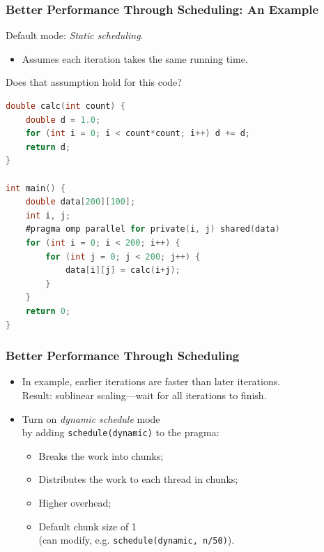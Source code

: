 \begin{frame}[fragile]
  \frametitle{Better Performance Through Scheduling: An Example}

  

  Default mode: \emph{Static scheduling}.
  \begin{itemize}
    \item Assumes each iteration takes the same running time.
  \end{itemize}

  Does that assumption hold for this code?

  \begin{lstlisting}[language=C,morekeywords={foreach,pragma,omp,parallel,single,nowait,task,untied,barrier,taskyield}]
double calc(int count) {
    double d = 1.0;
    for (int i = 0; i < count*count; i++) d += d;
    return d;
}

int main() {
    double data[200][100];
    int i, j;
    #pragma omp parallel for private(i, j) shared(data)
    for (int i = 0; i < 200; i++) {
        for (int j = 0; j < 200; j++) {
            data[i][j] = calc(i+j);
        }
    }
    return 0;
}
  \end{lstlisting}
  

\end{frame}

\begin{frame}[fragile]
  \frametitle{Better Performance Through Scheduling}

\large

  
  \begin{itemize}
    \item In example, earlier iterations are faster than later iterations.\\
          Result: sublinear scaling---wait for all iterations to finish.\\[1em]
    \item Turn on \emph{dynamic schedule} mode\\ by adding
      {\tt schedule(dynamic)} to the pragma:
      \begin{itemize}
        \item Breaks the work into chunks;
        \item Distributes the work to each thread in chunks;
        \item Higher overhead;
        \item Default chunk size of 1\\ (can modify, e.g. {\tt schedule(dynamic, n/50)}).
      \end{itemize}
  \end{itemize}
  


\end{frame}

